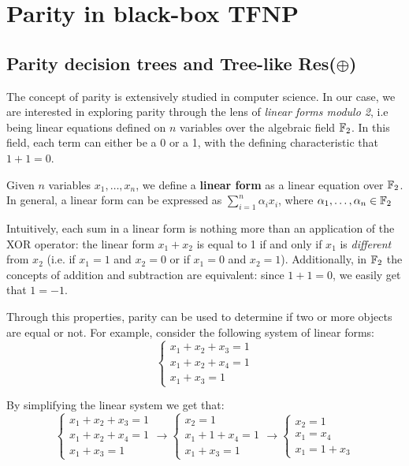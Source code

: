 
\chapter{Parity in black-box \textsf{TFNP}} \label{chap:parity-tfnp}

\section{Parity decision trees and Tree-like Res($\oplus$)}

The concept of parity is extensively studied in computer science. In our case, we are interested in exploring parity through the lens of \textit{linear forms modulo 2}, i.e being linear equations defined on $n$ variables over the algebraic field $\mathbb{F}_2$. In this field, each term can either be a 0 or a 1, with the defining characteristic that $1+1 = 0$.

\begin{definition}
    Given $n$ variables $x_1, \ldots, x_n$, we define a \textbf{linear form} as a linear equation over $\mathbb{F}_2$. In general, a linear form can be expressed as $\sum\limits_{i = 1}^n \alpha_i x_i$, where $\alpha_1, \ldots, \alpha_n \in \mathbb{F}_2$
\end{definition}

Intuitively, each sum in a linear form is nothing more than an application of the XOR operator: the linear form $x_1 + x_2$ is equal to 1 if and only if $x_1$ is \textit{different} from $x_2$ (i.e. if $x_1 = 1$ and $x_2 = 0$ or if $x_1 = 0$ and $x_2 = 1$). Additionally, in $\mathbb{F}_2$ the concepts of addition and subtraction are equivalent: since $1+1 = 0$, we easily get that $1 = -1$.

Through this properties, parity can be used to determine if two or more objects are equal or not. For example, consider the following system of linear forms:
\[\left \{ \begin{array}{l}
    x_1 + x_2 + x_3 = 1 \\
    x_1 + x_2 + x_4 = 1 \\
    x_1 + x_3 = 1
\end{array} \right .\]

By simplifying the linear system we get that:
\[\left \{ \begin{array}{l}
    x_1 + x_2 + x_3 = 1 \\
    x_1 + x_2 + x_4 = 1 \\
    x_1 + x_3 = 1
\end{array} \right . \longrightarrow
\left \{ \begin{array}{l}
    x_2 = 1\\
    x_1 + 1 + x_4 = 1 \\
    x_1 + x_3 = 1
\end{array} \right . \longrightarrow
\left \{ \begin{array}{l}
    x_2 = 1\\
    x_1 = x_4 \\
    x_1 = 1+x_3
\end{array} \right .\]

